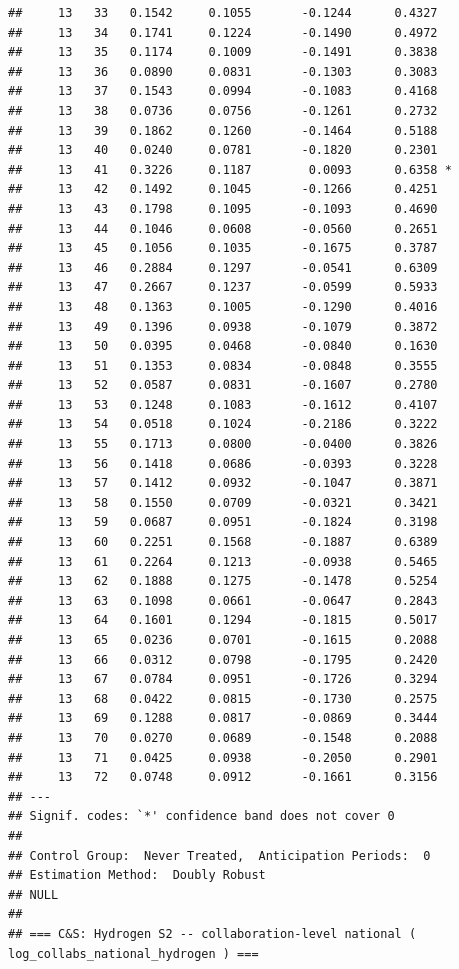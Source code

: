 \documentclass[
]{article}
\begin{document}
\begin{verbatim}
##     13   33   0.1542     0.1055       -0.1244      0.4327  
##     13   34   0.1741     0.1224       -0.1490      0.4972  
##     13   35   0.1174     0.1009       -0.1491      0.3838  
##     13   36   0.0890     0.0831       -0.1303      0.3083  
##     13   37   0.1543     0.0994       -0.1083      0.4168  
##     13   38   0.0736     0.0756       -0.1261      0.2732  
##     13   39   0.1862     0.1260       -0.1464      0.5188  
##     13   40   0.0240     0.0781       -0.1820      0.2301  
##     13   41   0.3226     0.1187        0.0093      0.6358 *
##     13   42   0.1492     0.1045       -0.1266      0.4251  
##     13   43   0.1798     0.1095       -0.1093      0.4690  
##     13   44   0.1046     0.0608       -0.0560      0.2651  
##     13   45   0.1056     0.1035       -0.1675      0.3787  
##     13   46   0.2884     0.1297       -0.0541      0.6309  
##     13   47   0.2667     0.1237       -0.0599      0.5933  
##     13   48   0.1363     0.1005       -0.1290      0.4016  
##     13   49   0.1396     0.0938       -0.1079      0.3872  
##     13   50   0.0395     0.0468       -0.0840      0.1630  
##     13   51   0.1353     0.0834       -0.0848      0.3555  
##     13   52   0.0587     0.0831       -0.1607      0.2780  
##     13   53   0.1248     0.1083       -0.1612      0.4107  
##     13   54   0.0518     0.1024       -0.2186      0.3222  
##     13   55   0.1713     0.0800       -0.0400      0.3826  
##     13   56   0.1418     0.0686       -0.0393      0.3228  
##     13   57   0.1412     0.0932       -0.1047      0.3871  
##     13   58   0.1550     0.0709       -0.0321      0.3421  
##     13   59   0.0687     0.0951       -0.1824      0.3198  
##     13   60   0.2251     0.1568       -0.1887      0.6389  
##     13   61   0.2264     0.1213       -0.0938      0.5465  
##     13   62   0.1888     0.1275       -0.1478      0.5254  
##     13   63   0.1098     0.0661       -0.0647      0.2843  
##     13   64   0.1601     0.1294       -0.1815      0.5017  
##     13   65   0.0236     0.0701       -0.1615      0.2088  
##     13   66   0.0312     0.0798       -0.1795      0.2420  
##     13   67   0.0784     0.0951       -0.1726      0.3294  
##     13   68   0.0422     0.0815       -0.1730      0.2575  
##     13   69   0.1288     0.0817       -0.0869      0.3444  
##     13   70   0.0270     0.0689       -0.1548      0.2088  
##     13   71   0.0425     0.0938       -0.2050      0.2901  
##     13   72   0.0748     0.0912       -0.1661      0.3156  
## ---
## Signif. codes: `*' confidence band does not cover 0
## 
## Control Group:  Never Treated,  Anticipation Periods:  0
## Estimation Method:  Doubly Robust
## NULL
## 
## === C&S: Hydrogen S2 -- collaboration-level national ( log_collabs_national_hydrogen ) ===
\end{verbatim}
\end{document}
